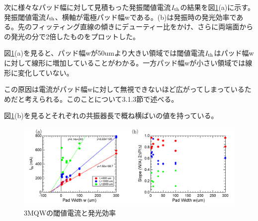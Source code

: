 \clearpage
次に様々なパッド幅に対して見積もった発振閾値電流$I_{\rm{th}}$の結果を図\ref{fig:fig_3_1_3QW_broadcontact_Ith}(a)に示す。発振閾値電流$I_{\rm{th}}$、横軸が電極パッド幅wである。(b)は発振時の発光効率である。先のフィッティング直線の傾きにデューティー比をかけ、さらに両端面からの発光の分で2倍したものをプロットした。

図\ref{fig:fig_3_1_3QW_broadcontact_Ith}(a)を見ると、パッド幅wが50umより大きい領域では閾値電流$I_{\rm{th}}$はパッド幅wに対して線形に増加していることがわかる。一方パッド幅wが小さい領域では線形に変化していない。

この原因は電流がパッド幅wに対して無視できないほど広がってしまっているためだと考えられる。このことについて3.1.3節で述べる。

図\ref{fig:fig_3_1_3QW_broadcontact_Ith}(b)を見るとそれぞれの共振器長で概ね横ばいの値を持っている。

\begin{figure}[hb]
	\centering
	\includegraphics[width=15cm]{figure/fig_3_1_3QW_broadcontact_Ith.png}
		\caption{3MQWの閾値電流と発光効率}
		\label{fig:fig_3_1_3QW_broadcontact_Ith}
\end{figure}
\clearpage
